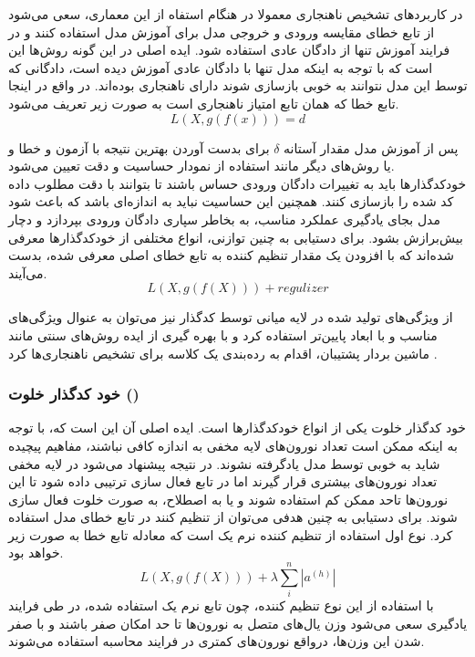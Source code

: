 \documentclass[12pt,a4paper]{report}
\begin{document}
در کاربردهای تشخیص ناهنجاری معمولا در هنگام استفاه از این معماری، سعی می‌شود از تابع خطای مقایسه ورودی و خروجی مدل برای آموزش مدل استفاده کنند و در فرایند آموزش تنها از دادگان عادی استفاده شود. ایده اصلی در این گونه روش‌ها این است که با توجه به اینکه مدل تنها با دادگان عادی آموزش دیده است، دادگانی که توسط این مدل نتوانند به خوبی بازسازی شوند دارای ناهنجاری بوده‌اند. در واقع در اینجا تابع خطا که همان تابع امتیاز ناهنجاری است به صورت زیر تعریف می‌شود.
\begin{equation}
	L(X, g(f(x))) = d
\end{equation}

پس از آموزش مدل مقدار آستانه $\delta$ برای بدست آوردن بهترین نتیجه با آزمون و خطا و یا روش‌های دیگر مانند استفاده از نمودار حساسیت و دقت تعیین می‌شود. \\

خودکدگذار‌ها باید به تغییرات دادگان ورودی حساس باشند تا بتوانند با دقت مطلوب داده کد شده را بازسازی کنند. همچنین این حساسیت نباید به اندازه‌ای باشد که باعث شود مدل بجای یادگیری عملکرد مناسب، به بخاطر سپاری دادگان ورودی بپردازد و دچار بیش‌برازش بشود. برای دستیابی به چنین توازنی، انواع مختلفی از خودکدگذارها معرفی شده‌اند که با افزودن یک مقدار تنظیم کننده به تابع خطای اصلی معرفی شده، بدست می‌آیند.
\begin{equation}
	L(X, g(f(X))) + regulizer
\end{equation}

از ویژگی‌های تولید شده در لایه میانی توسط کدگذار نیز می‌توان به عنوال ویژگی‌های مناسب و با ابعاد پایین‌تر استفاده کرد و با بهره گیری از ایده روش‌های سنتی مانند ماشین بردار پشتیبان، اقدام به رده‌بندی یک کلاسه برای تشخیص ناهنجاری‌ها کرد \cite{Nguyen}.

\subsubsection{خود کدگذار خلوت  ()}
خود کدگذار خلوت یکی از انواع خودکدگذار‌ها است. ایده اصلی آن این است که، با توجه به اینکه ممکن است تعداد نورون‌های لایه مخفی به اندازه کافی نباشند، مفاهیم پیچیده  شاید به خوبی توسط مدل یادگرفته نشوند. در نتیجه پیشنهاد می‌شود در لایه مخفی تعداد نورون‌های بیشتری قرار گیرند اما در تابع فعال سازی ترتیبی داده شود تا این نورون‌ها تاحد ممکن کم استفاده شوند و یا به اصطلاح، به صورت خلوت فعال سازی شوند. برای دستیابی به چنین هدفی می‌توان از تنظیم کنند در تابع خطای مدل استفاده کرد. نوع اول استفاده از تنظیم کننده نرم یک است که معادله تابع خطا به صورت زیر خواهد بود.
\begin{equation}
L(X, g(f(X))) + \lambda \sum_{i}^{n}|a^{(h)}|
\end{equation}
با استفاده از این نوع تنظیم کننده، چون تابع نرم یک استفاده شده، در طی فرایند یادگیری سعی می‌شود وزن یال‌های متصل به نورون‌ها تا حد امکان صفر باشند و با صفر شدن این وزن‌ها، درواقع نورون‌های کمتری در فرایند محاسبه استفاده می‌شوند. 
\end{document}
